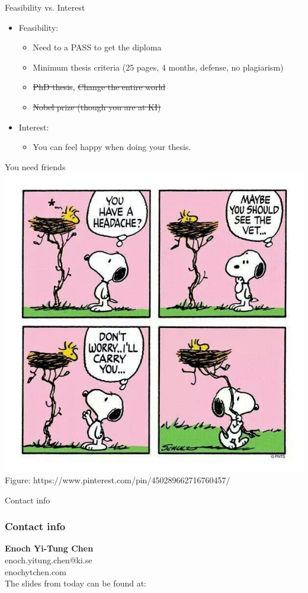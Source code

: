 \documentclass{beamer}
\begin{document}
\begin{frame}{Feasibility vs. Interest}
	\begin{itemize}
	\item Feasibility: 
	      \begin{itemize}
	      \item<1-> Need to a PASS to get the diploma
	      \item<2-> Minimum	 thesis criteria (25 pages, 4 months, defense, no plagiarism)
	      \item<3-> \st{PhD thesis}, \st{Change the entire world}
	      \item<4-> \st{Nobel prize (though you are at KI)}
	      \end{itemize}
	\item<1->  Interest:
		 \begin{itemize}
		 \item<5-> You can feel happy when doing your thesis.

		 \end{itemize}
		\end{itemize}
\end{frame}

\begin{frame}{You need friends}
	\center
	\includegraphics[scale=0.3]{image/snoopy}\\
	\small{Figure: https://www.pinterest.com/pin/450289662716760457/}
\end{frame}



\begin{frame}{Contact info}

\frametitle{Contact info}
\textbf{Enoch Yi-Tung Chen}\\

enoch.yitung.chen@ki.se\\
enochytchen.com\\

The slides from today can be found at:

\end{frame}
\end{document}
